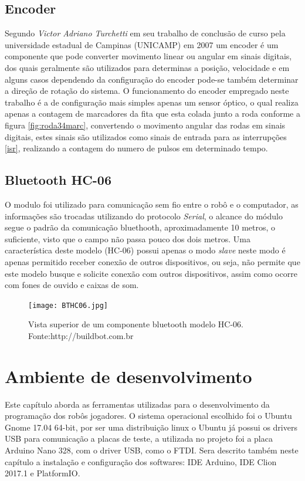 \documentclass[a4paper,12pt,portuguese]{ufms-cpcx}
\begin{document}
\section{Encoder}\label{encoder}
Segundo \textit{Victor Adriano Turchetti} em seu trabalho de conclusão de curso pela universidade estadual de Campinas (UNICAMP) em 2007 um encoder é um componente que pode converter movimento linear ou angular em sinais digitais, dos quais geralmente são utilizados para determinas a posição, velocidade e em alguns casos dependendo da configuração do encoder pode-se também determinar a direção de rotação do sistema. O funcionamento do encoder empregado neste trabalho é a de configuração mais simples apenas um sensor óptico, o qual realiza apenas a contagem de marcadores da fita que esta colada junto a roda conforme a figura \ref{fig:roda34marc}, convertendo o movimento angular das rodas em sinais digitais, estes sinais são utilizados como sinais de entrada para as interrupções \ref{isr}, realizando a contagem do numero de pulsos em determinado tempo.

\section{Bluetooth HC-06}\label{bthc06}
O modulo foi utilizado para comunicação sem fio entre o robô e o computador, as informações são trocadas utilizando do protocolo \textit{Serial}, o alcance do módulo segue o padrão da comunicação bluethooth, aproximadamente 10 metros, o suficiente, visto que o campo não passa pouco dos dois metros. Uma característica deste modelo (HC-06) possui apenas o modo \textit{slave} neste modo é apenas permitido receber conexão de outros dispositivos, ou seja, não permite que este modelo busque e solicite conexão com outros dispositivos, assim como ocorre com fones de ouvido e caixas de som.
\begin{figure}[H]	
	\centering
	\texttt{[image: BTHC06.jpg]}
	\caption{Vista superior de um componente bluetooth modelo HC-06. Fonte:http://buildbot.com.br}
\end{figure}

\chapter{Ambiente de desenvolvimento}
Este capítulo aborda as ferramentas utilizadas para o desenvolvimento da programação dos robôs jogadores. O sistema operacional escolhido foi o Ubuntu Gnome 17.04 64-bit, por ser uma distribuição linux o Ubuntu já possui os drivers USB para comunicação a placas de teste, a utilizada no projeto foi a placa Arduino Nano 328, com o driver USB, como o FTDI. Sera descrito também neste capítulo a instalação e configuração dos softwares: IDE Arduino, IDE Clion 2017.1 e PlatformIO.
\end{document}

